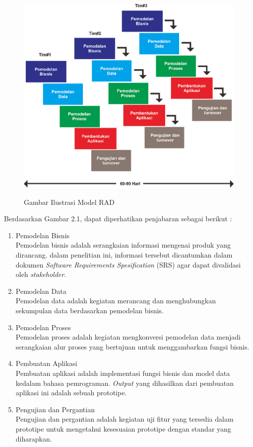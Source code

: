 \begin{flushleft}
\begin{justify}
\begin{figure}[ht]
	    \includegraphics[width=12cm]{images/RAD.png}\\
            \caption{Gambar Ilustrasi Model RAD}
        \end{figure}
        Berdasarkan Gambar 2.1, dapat diperhatikan penjabaran sebagai berikut :
        \begin{enumerate}[label=\alph*.]
            \item Pemodelan Bisnis\\
            Pemodelan bisnis adalah serangkaian informasi mengenai produk yang dirancang. 
            dalam penelitian ini, informasi tersebut dicantumkan dalam dokumen \emph{Software Requirements Spesification} (SRS) agar dapat divalidasi oleh \emph{stakeholder}. 
            \item Pemodelan Data\\
            Pemodelan data adalah kegiatan merancang dan menghubungkan sekumpulan data berdasarkan pemodelan bisnis.
            \item Pemodelan Proses\\
            Pemodelan proses adalah kegiatan mengkonversi pemodelan data menjadi serangkaian alur proses yang bertujuan untuk menggambarkan fungsi bisnis.  
            \item Pembuatan Aplikasi\\
            Pembuatan aplikasi adalah  implementasi fungsi bisnis dan model data  kedalam bahasa pemrograman. \emph{Output} yang dihasilkan dari pembuatan aplikasi ini adalah sebuah prototipe. 
            \item Pengujian dan Pergantian\\
            Pengujian dan pergantian adalah kegiatan uji fitur yang tersedia dalam prototipe untuk mengetahui kesesuaian prototipe dengan standar yang diharapkan.\\
        \end{enumerate}


\end{justify}
\end{flushleft}
